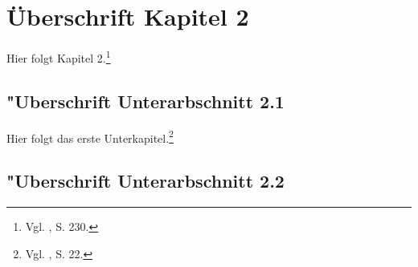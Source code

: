 \section{\"{U}berschrift Kapitel 2\label{sec:2}}

Hier folgt Kapitel 2.\footnote{Vgl. \citet{Cox1979}, S. 230.}

\subsection{"Uberschrift Unterarbschnitt 2.1\label{sec:2.1}}

Hier folgt das erste Unterkapitel.\footnote{Vgl. \citet{Skantze2000}, S. 22.}

\subsection{"Uberschrift Unterarbschnitt 2.2\label{sec:2.2}}


%
